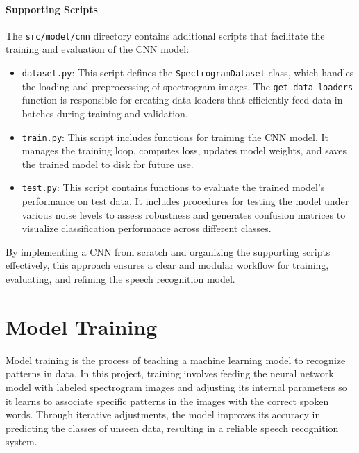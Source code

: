 \documentclass[12pt]{article}
\begin{document}
\paragraph{Supporting Scripts}

The \texttt{src/model/cnn} directory contains additional scripts that facilitate the training and evaluation of the CNN model:

\begin{itemize}
    \item \texttt{dataset.py}: This script defines the \texttt{SpectrogramDataset} class, which handles the loading and preprocessing of spectrogram images. The \texttt{get\_data\_loaders} function is responsible for creating data loaders that efficiently feed data in batches during training and validation.
    
    \item \texttt{train.py}: This script includes functions for training the CNN model. It manages the training loop, computes loss, updates model weights, and saves the trained model to disk for future use.
    
    \item \texttt{test.py}: This script contains functions to evaluate the trained model's performance on test data. It includes procedures for testing the model under various noise levels to assess robustness and generates confusion matrices to visualize classification performance across different classes.
\end{itemize}

By implementing a CNN from scratch and organizing the supporting scripts effectively, this approach ensures a clear and modular workflow for training, evaluating, and refining the speech recognition model.

\newpage




\section{Model Training}

Model training is the process of teaching a machine learning model to recognize patterns in data. In this project, training involves feeding the neural network model with labeled spectrogram images and adjusting its internal parameters so it learns to associate specific patterns in the images with the correct spoken words. Through iterative adjustments, the model improves its accuracy in predicting the classes of unseen data, resulting in a reliable speech recognition system.
\end{document}

